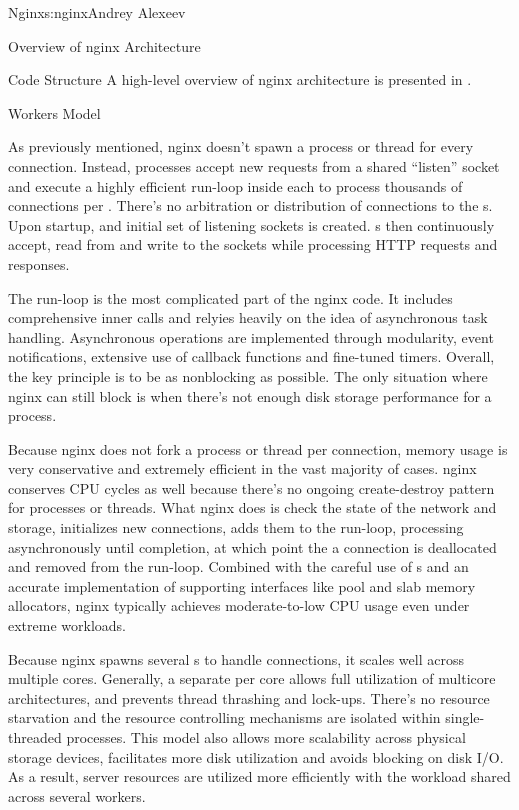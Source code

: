 \begin{aosachapter}{Nginx}{s:nginx}{Andrey Alexeev}
\begin{aosasect1}{Overview of nginx Architecture}
\begin{aosasect2}{Code Structure}
A high-level overview of nginx architecture is presented in
.


\end{aosasect2}

\begin{aosasect2}{Workers Model}

As previously mentioned, nginx doesn't spawn a process or thread for
every connection. Instead,  processes accept new requests
from a shared ``listen'' socket and execute a highly efficient
run-loop inside each  to process thousands of connections
per . There's no arbitration or distribution of
connections to the s. Upon startup, and initial set of
listening sockets is created. s then continuously accept,
read from and write to the sockets while processing HTTP requests and
responses.

The run-loop is the most complicated part of the nginx 
code. It includes comprehensive inner calls and relyies heavily on the
idea of asynchronous task handling. Asynchronous operations are
implemented through modularity, event notifications, extensive use of
callback functions and fine-tuned timers. Overall, the key principle
is to be as nonblocking as possible. The only situation where nginx
can still block is when there's not enough disk storage performance
for a  process.

Because nginx does not fork a process or thread per connection, memory
usage is very conservative and extremely efficient in the vast
majority of cases. nginx conserves CPU cycles as well because there's
no ongoing create-destroy pattern for processes or threads. What nginx
does is check the state of the network and storage, initializes new
connections, adds them to the run-loop, processing asynchronously
until completion, at which point the a connection is deallocated and
removed from the run-loop. Combined with the careful use of
s and an accurate implementation of supporting
interfaces like pool and slab memory allocators, nginx typically
achieves moderate-to-low CPU usage even under extreme workloads.

Because nginx spawns several s to handle connections, it
scales well across multiple cores. Generally, a separate 
per core allows full utilization of multicore architectures, and
prevents thread thrashing and lock-ups. There's no resource starvation
and the resource controlling mechanisms are isolated within
single-threaded  processes. This model also allows more
scalability across physical storage devices, facilitates more disk
utilization and avoids blocking on disk I/O. As a result, server
resources are utilized more efficiently with the workload shared
across several workers.


\end{aosasect2}
\end{aosasect1}
\end{aosachapter}
